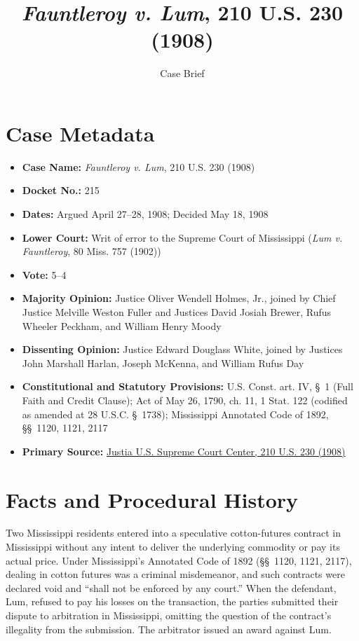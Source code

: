 \documentclass[12pt]{article}
\title{\textit{Fauntleroy v. Lum}, 210 U.S. 230 (1908)}
\author{Case Brief}
\date{}
\begin{document}
\maketitle

\section{Case Metadata}

\begin{itemize}
    \item \textbf{Case Name:} \textit{Fauntleroy v. Lum}, 210 U.S. 230 (1908)
    \item \textbf{Docket No.:} 215
    \item \textbf{Dates:} Argued April 27--28, 1908; Decided May 18, 1908
    \item \textbf{Lower Court:} Writ of error to the Supreme Court of Mississippi (\textit{Lum v. Fauntleroy}, 80 Miss. 757 (1902))
    \item \textbf{Vote:} 5--4
    \item \textbf{Majority Opinion:} Justice Oliver Wendell Holmes, Jr., joined by Chief Justice Melville Weston Fuller and Justices David Josiah Brewer, Rufus Wheeler Peckham, and William Henry Moody
    \item \textbf{Dissenting Opinion:} Justice Edward Douglass White, joined by Justices John Marshall Harlan, Joseph McKenna, and William Rufus Day
    \item \textbf{Constitutional and Statutory Provisions:} U.S. Const. art. IV, \S~1 (Full Faith and Credit Clause); Act of May 26, 1790, ch. 11, 1 Stat. 122 (codified as amended at 28 U.S.C. \S~1738); Mississippi Annotated Code of 1892, \S\S~1120, 1121, 2117
    \item \textbf{Primary Source:} \href{https://supreme.justia.com/cases/federal/us/210/230/}{Justia U.S. Supreme Court Center, 210 U.S. 230 (1908)}
\end{itemize}

\section{Facts and Procedural History}

Two Mississippi residents entered into a speculative cotton-futures contract in Mississippi without any intent to deliver the underlying commodity or pay its actual price. Under Mississippi's Annotated Code of 1892 (\S\S~1120, 1121, 2117), dealing in cotton futures was a criminal misdemeanor, and such contracts were declared void and ``shall not be enforced by any court.'' When the defendant, Lum, refused to pay his losses on the transaction, the parties submitted their dispute to arbitration in Mississippi, omitting the question of the contract's illegality from the submission. The arbitrator issued an award against Lum.
\end{document}
